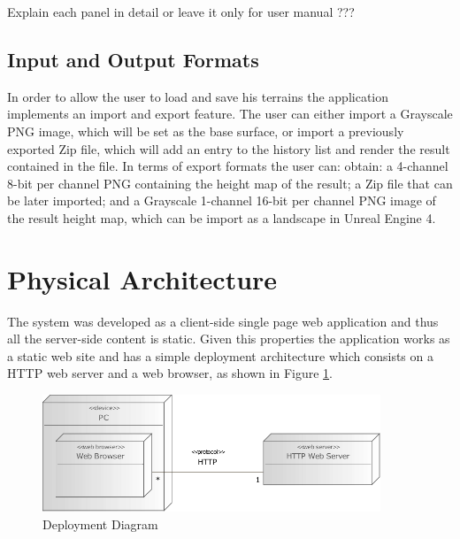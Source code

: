       \begin{notes}
      	\item Explain each panel in detail or leave it only for user manual ???
      \end{notes}
    
    \subsection {Input and Output Formats}
    
      In order to allow the user to load and save his terrains the application implements an import and export feature. The user can either import a Grayscale PNG image, which will be set as the base surface, or import a previously exported Zip file, which will add an entry to the history list and render the result contained in the file. In terms of export formats the user can: obtain: a 4-channel 8-bit per channel PNG containing the height map of the result; a Zip file that can be later imported; and a Grayscale 1-channel 16-bit per channel PNG image of the result height map, which can be import as a landscape in Unreal Engine 4.

  \section {Physical Architecture} %
    
    The system was developed as a client-side single page web application and thus all the server-side content is static. Given this properties the application works as a static web site and has a simple deployment architecture which consists on a HTTP web server and a web browser, as shown in Figure \ref{fig:deployment_diagram}.
    
    \begin{figure}[h!]
    	\begin{center}
    		\includegraphics[width=0.9\textwidth]{images/diagrams/deployment.pdf}
    	\end{center}
    	\caption{Deployment Diagram}
    	\label{fig:deployment_diagram}
    \end{figure}
    
